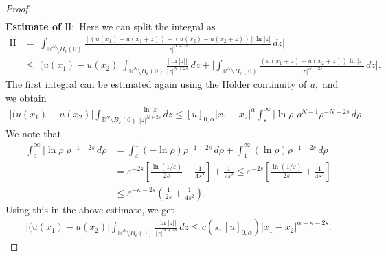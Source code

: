 \documentclass[notitlepage,11pt,reqno]{amsart}
\theoremstyle{definition}
\numberwithin{equation}{section}
\newcommand{\RR}{\mathds{R}}
\begin{document}
\begin{proof}
\begin{align*}
\end{align*}
\textbf{Estimate of $\mathrm {II}:$ } Here we can split the integral as
\begin{align*}
    \mathrm{II}&=\Bigg|\int_{\RR^N\setminus B_{\varepsilon}(0)}\frac{[(u(x_1)-u(x_1+z))-(u(x_2)-u(x_2+z))]\ln |z|}{|z|^{N+2s}}\, dz\Bigg|\\
    &\leq |(u(x_1)-u(x_2)|\int_{\RR^N\setminus B_{\varepsilon}(0)}\frac{|\ln |z||}{|z|^{N+2s}}\, dz+\Bigg|\int_{\RR^N\setminus B_{\varepsilon}(0)}\frac{(u(x_1+z)-u(x_2+z))\ln |z|}{|z|^{N+2s}}\, dz\Bigg|.
\end{align*} 
The first integral can be estimated again using the H\"{o}lder continuity of $u,$ and we obtain
\begin{align*}
 |(u(x_1)-u(x_2)|\int_{\RR^N\setminus B_{\varepsilon}(0)}\frac{|\ln |z||}{|z|^{N+2s}}\, dz\leq [u]_{0, \alpha}|x_1-x_2|^{\alpha} \int_{\varepsilon}^{\infty}|\ln \rho|\rho^{N-1}\rho^{-N-2s}\, d\rho.  
\end{align*}
We note that
\begin{align*}
    \int_{\varepsilon}^{\infty} |\ln \rho|\rho^{-1-2s}\, d\rho&=\int_{\varepsilon}^{1} (-\ln \rho)\rho^{-1-2s}\, d\rho+ \int_{1}^{\infty}  (\ln \rho)\rho^{-1-2s}\, d\rho\\
    &=\varepsilon^{-2s}\left[\frac{\ln (1/\varepsilon)}{2s}-\frac{1}{4s^2}\right]+\frac{1}{2s^2}\leq \varepsilon^{-2s}\left[\frac{\ln (1/\varepsilon)}{2s}+\frac{1}{4s^2}\right]\\
    &\leq \varepsilon^{-\kappa-2s}\left(\frac{1}{2s}+\frac{1}{4s^2}\right).
\end{align*}
Using this in the above estimate, we get
\begin{align*}
|(u(x_1)-u(x_2)|\int_{\RR^N\setminus B_{\varepsilon}(0)}\frac{|\ln |z||}{|z|^{N+2s}}\, dz \leq c(s, [u]_{0, \alpha})|x_1-x_2|^{\alpha-\kappa-2s}.    
\end{align*}


\end{proof}
\end{document}
